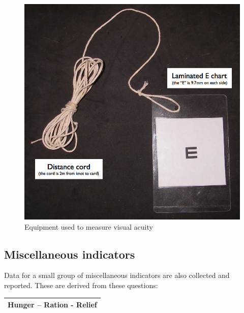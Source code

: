 \documentclass[12pt,a4paper]{book}
\theoremstyle{definition}
\theoremstyle{definition}
\theoremstyle{definition}
\theoremstyle{remark}
\begin{document}
\begin{figure}[H]

{\centering \includegraphics{figures/indicators29} 

}

\caption{Equipment used to measure visual acuity}\label{fig:indicators29}
\end{figure}

\hypertarget{miscellaneous-indicators}{%
\subsection{Miscellaneous indicators}\label{miscellaneous-indicators}}

Data for a small group of miscellaneous indicators are also collected
and reported. These are derived from these questions:

\begin{longtable}[]{@{}c@{}}
\toprule
\begin{minipage}[t]{0.97\columnwidth}\centering
\textbf{Hunger -- Ration - Relief}\strut
\end{minipage}\tabularnewline
\bottomrule
\end{longtable}
\end{document}
